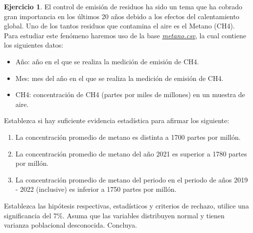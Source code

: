 \documentclass[
]{book}
\providecommand{\tightlist}{%
  \setlength{\itemsep}{0pt}\setlength{\parskip}{0pt}}
\theoremstyle{definition}
\theoremstyle{definition}
\theoremstyle{definition}
\newtheorem{exercise}{Ejercicio}[chapter]
\theoremstyle{definition}
\theoremstyle{remark}
\begin{document}
\begin{exercise}
\protect\hypertarget{exr:metano}{}\label{exr:metano}El control de emisión de residuos ha sido un tema que ha cobrado gran importancia en los últimos 20 años debido a los efectos del calentamiento global. Uno de los tantos residuos que contamina el aire es el Metano (CH4). Para estudiar este fenómeno haremos uso de la base \href{https://raw.githubusercontent.com/Dfranzani/Bases-de-datos-para-cursos/main/2022-2/Estad\%C3\%ADstica\%202/metano.csv}{\emph{metano.csv}}, la cual contiene los siguientes datos:

\begin{itemize}
\tightlist
\item
  Año: año en el que se realiza la medición de emisión de CH4.
\item
  Mes: mes del año en el que se realiza la medición de emisión de CH4.
\item
  CH4: concentración de CH4 (partes por miles de millones) en un muestra de aire.
\end{itemize}

Establezca si hay suficiente evidencia estadística para afirmar los siguiente:

\begin{enumerate}
\def\labelenumi{\arabic{enumi}.}
\tightlist
\item
  La concentración promedio de metano es distinta a 1700 partes por millón.
\item
  La concentración promedio de metano del año 2021 es superior a 1780 partes por millón.
\item
  La concentración promedio de metano del periodo en el periodo de años 2019 - 2022 (inclusive) es inferior a 1750 partes por millón.
\end{enumerate}

Establezca las hipótesis respectivas, estadísticos y criterios de rechazo, utilice una significancia del 7\%. Asuma que las variables distribuyen normal y tienen varianza poblacional desconocida. Concluya.
\end{exercise}
\end{document}
